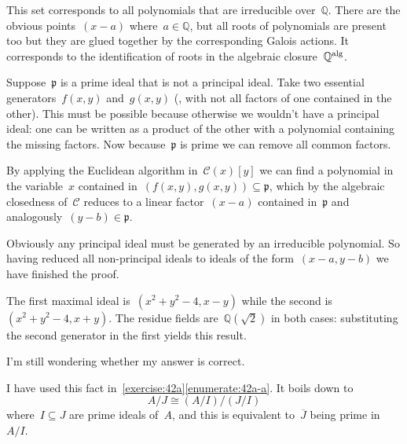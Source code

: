 \begin{exercise}
  This set corresponds to all polynomials that are irreducible over~$\mathbb{Q}$. There are the obvious points~$(x-a)$ where~$a\in\mathbb{Q}$, but all roots of polynomials are present too but they are glued together by the corresponding Galois actions. It corresponds to the identification of roots in the algebraic closure~$\mathbb{Q}^{\operatorname{alg}}$.
\end{exercise}

\begin{exercise}
  Suppose~$\mathfrak{p}$ is a prime ideal that is not a principal ideal. Take two essential generators~$f(x,y)$ and~$g(x,y)$ (\ie, with not all factors of one contained in the other). This must be possible because otherwise we wouldn't have a principal ideal: one can be written as a product of the other with a polynomial containing the missing factors. Now because~$\mathfrak{p}$ is prime we can remove all common factors.

  By applying the Euclidean algorithm in~$\mathcal{C}(x)[y]$ we can find a polynomial in the variable~$x$ contained in~$(f(x,y),g(x,y))\subseteq\mathfrak{p}$, which by the algebraic closedness of~$\mathcal{C}$ reduces to a linear factor~$(x-a)$ contained in~$\mathfrak{p}$ and analogously~$(y-b)\in\mathfrak{p}$.

  Obviously any principal ideal must be generated by an irreducible polynomial. So having reduced all non-principal ideals to ideals of the form~$(x-a,y-b)$ we have finished the proof.
\end{exercise}

\begin{exercise}
  The first maximal ideal is~$(x^2+y^2-4,x-y)$ while the second is~$(x^2+y^2-4,x+y)$. The residue fields are~$\mathbb{Q}(\sqrt{2})$ in both cases: substituting the second generator in the first yields this result.
\end{exercise}

\begin{exercise} %
  I'm still wondering whether my answer is correct.
\end{exercise}

\begin{exercise}
  \label{exercise:42g}
  I have used this fact in~\autoref{exercise:42a}\ref{enumerate:42a-a}. It boils down to
  \begin{equation}
    A/J\cong (A/I)/(J/I) 
  \end{equation}
  where~$I\subseteq J$ are prime ideals of~$A$, and this is equivalent to~$\overline{J}$ being prime in~$A/I$.
\end{exercise}

